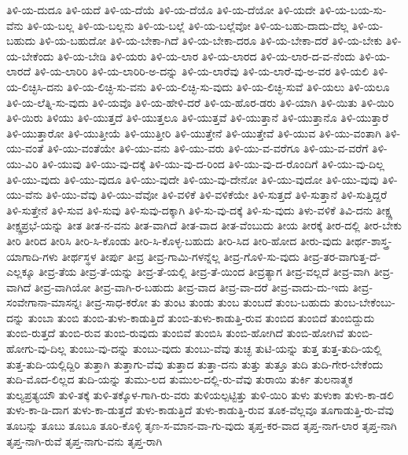{ತಿಳಿ-ಯ-ದುದೂ
ತಿಳಿ-ಯದೆ
ತಿಳಿ-ಯ-ದೆಯೆ
ತಿಳಿ-ಯ-ದೆಯೊ
ತಿಳಿ-ಯ-ದೆಯೋ
ತಿಳಿ-ಯದೇ
ತಿಳಿ-ಯ-ಬಯ-ಸು-ವೆನು
ತಿಳಿ-ಯ-ಬಲ್ಲ
ತಿಳಿ-ಯ-ಬಲ್ಲನು
ತಿಳಿ-ಯ-ಬಲ್ಲೆ
ತಿಳಿ-ಯ-ಬಲ್ಲೆವೋ
ತಿಳಿ-ಯ-ಬಹು-ದಾದು-ದೆಲ್ಲ
ತಿಳಿ-ಯ-ಬಹುದು
ತಿಳಿ-ಯ-ಬಹುದೋ
ತಿಳಿ-ಯ-ಬೇಕಾ-ಗಿದೆ
ತಿಳಿ-ಯ-ಬೇಕಾ-ದರೂ
ತಿಳಿ-ಯ-ಬೇಕಾ-ದರೆ
ತಿಳಿ-ಯ-ಬೇಕು
ತಿಳಿ-ಯ-ಬೇಕೆಂದು
ತಿಳಿ-ಯ-ಬೇಡಿ
ತಿಳಿ-ಯರು
ತಿಳಿ-ಯ-ಲಾರ
ತಿಳಿ-ಯ-ಲಾರದ
ತಿಳಿ-ಯ-ಲಾರ-ದ-ವ-ನೆಂದು
ತಿಳಿ-ಯ-ಲಾರದೆ
ತಿಳಿ-ಯ-ಲಾರಿರಿ
ತಿಳಿ-ಯ-ಲಾರಿರಿ-ಅ-ದನ್ನು
ತಿಳಿ-ಯ-ಲಾರೆವು
ತಿಳಿ-ಯ-ಲಾರೆ-ವು-ಅ-ವರ
ತಿಳಿ-ಯಲಿ
ತಿಳಿ-ಯ-ಲಿಚ್ಛಿಸಿ-ದನು
ತಿಳಿ-ಯ-ಲಿಚ್ಛಿ-ಸು-ವನು
ತಿಳಿ-ಯ-ಲಿಚ್ಛಿ-ಸು-ವುದು
ತಿಳಿ-ಯ-ಲಿಚ್ಛಿ-ಸುವೆ
ತಿಳಿ-ಯಲು
ತಿಳಿ-ಯಲೂ
ತಿಳಿ-ಯ-ಲೆತ್ನಿ-ಸು-ವುದು
ತಿಳಿ-ಯವೊ
ತಿಳಿ-ಯ-ಹೇಳಿ-ದರೆ
ತಿಳಿ-ಯ-ಹೊರ-ಡರು
ತಿಳಿ-ಯಾಗಿ
ತಿಳಿ-ಯಿತು
ತಿಳಿ-ಯಿರಿ
ತಿಳಿ-ಯಿರು
ತಿಳಿಯು
ತಿಳಿ-ಯುತ್ತದೆ
ತಿಳಿ-ಯುತ್ತಲೂ
ತಿಳಿ-ಯುತ್ತವೆ
ತಿಳಿ-ಯುತ್ತಾನೆ
ತಿಳಿ-ಯುತ್ತಾನೊ
ತಿಳಿ-ಯುತ್ತಾರೆ
ತಿಳಿ-ಯುತ್ತಾರೋ
ತಿಳಿ-ಯುತ್ತೀಯೆ
ತಿಳಿ-ಯುತ್ತೀರಿ
ತಿಳಿ-ಯುತ್ತೇನೆ
ತಿಳಿ-ಯುತ್ತೇವೆ
ತಿಳಿ-ಯುವ
ತಿಳಿ-ಯು-ವಂತಾಗಿ
ತಿಳಿ-ಯು-ವಂತೆ
ತಿಳಿ-ಯು-ವಂತೆಯೇ
ತಿಳಿ-ಯು-ವನು
ತಿಳಿ-ಯು-ವರು
ತಿಳಿ-ಯು-ವ-ವರೆಗೂ
ತಿಳಿ-ಯು-ವ-ವರೆಗೆ
ತಿಳಿ-ಯು-ವಿರಿ
ತಿಳಿ-ಯುವು
ತಿಳಿ-ಯು-ವು-ದಕ್ಕೆ
ತಿಳಿ-ಯು-ವು-ದ-ರಿಂದ
ತಿಳಿ-ಯು-ವು-ದ-ರೊಂದಿಗೆ
ತಿಳಿ-ಯು-ವು-ದಿಲ್ಲ
ತಿಳಿ-ಯು-ವುದು
ತಿಳಿ-ಯು-ವುದೂ
ತಿಳಿ-ಯು-ವುದೇ
ತಿಳಿ-ಯು-ವು-ದೇನೋ
ತಿಳಿ-ಯು-ವುದೋ
ತಿಳಿ-ಯು-ವುವು
ತಿಳಿ-ಯು-ವೆನು
ತಿಳಿ-ಯು-ವೆವು
ತಿಳಿ-ಯು-ವೆವೋ
ತಿಳಿ-ವಳಿಕೆ
ತಿಳಿ-ವಳಿಕೆಯೇ
ತಿಳಿ-ಸುತ್ತದೆ
ತಿಳಿ-ಸುತ್ತಾನೆ
ತಿಳಿ-ಸುತ್ತಿದ್ದರೆ
ತಿಳಿ-ಸುತ್ತೇನೆ
ತಿಳಿ-ಸುವ
ತಿಳಿ-ಸುವು
ತಿಳಿ-ಸುವು-ದಕ್ಕಾಗಿ
ತಿಳಿ-ಸು-ವು-ದಕ್ಕೆ
ತಿಳಿ-ಸು-ವುದು
ತಿಳು-ವಳಿಕೆ
ತಿವಿ-ದನು
ತೀಕ್ಷ್ಣ
ತೀಕ್ಷ್ಣಪ್ರಭೆ-ಯನ್ನು
ತೀತ
ತೀತ-ನ-ವನು
ತೀತ-ವಾಗಿದೆ
ತೀತ-ವಾದ
ತೀತ-ವೆಂಬುದು
ತೀಯ
ತೀರಕ್ಕೆ
ತೀರ-ದಲ್ಲಿ
ತೀರ-ಬೇಕು
ತೀರಿ
ತೀರಿದ
ತೀರಿಸಿ
ತೀರಿ-ಸಿ-ಕೊಂಡು
ತೀರಿ-ಸಿ-ಕೊಳ್ಳ-ಬಹುದು
ತೀರಿ-ಸಿದ
ತೀರಿ-ಹೋದ
ತೀರು-ವುದು
ತೀರ್ಥ-ಶಾಸ್ತ್ರ-ಯಾಗಾದಿ-ಗಳು
ತೀರ್ಥಸ್ಥಳ
ತೀರ್ಪು
ತೀವ್ರ
ತೀವ್ರ-ಗಾಮಿ-ಗಳನ್ನೆಲ್ಲ
ತೀವ್ರ-ಗೊಳಿ-ಸು-ವುದು
ತೀವ್ರ-ತರ-ವಾಗುತ್ತ-ದೆ-ಎಲ್ಲಕ್ಕೂ
ತೀವ್ರ-ತೆಯ
ತೀವ್ರ-ತೆ-ಯನ್ನು
ತೀವ್ರ-ತೆ-ಯಲ್ಲಿ
ತೀವ್ರ-ತೆ-ಯಿಂದ
ತೀವ್ರತ್ಯಾಗ
ತೀವ್ರ-ವಲ್ಲದೆ
ತೀವ್ರ-ವಾಗಿ
ತೀವ್ರ-ವಾಗಿದೆ
ತೀವ್ರ-ವಾಗಿಯೋ
ತೀವ್ರ-ವಾಗಿ-ರ-ಬಹುದು
ತೀವ್ರ-ವಾದ
ತೀವ್ರ-ವಾ-ದರೆ
ತೀವ್ರ-ವಾದು-ದು-ಇದು
ತೀವ್ರ-ಸಂವೇಗಾನಾ-ಮಾಸನ್ನಃ
ತೀವ್ರ-ಸಾಧ-ಕರೋ
ತು
ತುಂಟ
ತುಂಡು
ತುಂಬ
ತುಂಬದೆ
ತುಂಬ-ಬಹುದು
ತುಂಬ-ಬೇಕೆಂಬು-ದನ್ನು
ತುಂಬಾ
ತುಂಬಿ
ತುಂಬಿ-ತುಳು-ಕಾಡುತ್ತಿದೆ
ತುಂಬಿ-ತುಳು-ಕಾಡುತ್ತಿ-ರುವ
ತುಂಬಿದ
ತುಂಬಿದೆ
ತುಂಬಿದ್ದುದು
ತುಂಬಿ-ರುತ್ತದೆ
ತುಂಬಿ-ರುವ
ತುಂಬಿ-ರುವುದು
ತುಂಬಿವೆ
ತುಂಬಿಸಿ
ತುಂಬಿ-ಹೋಗಿದೆ
ತುಂಬಿ-ಹೋಗಿವೆ
ತುಂಬಿ-ಹೋಗು-ವು-ದಿಲ್ಲ
ತುಂಬು-ವು-ದನ್ನು
ತುಂಬು-ವುದು
ತುಂಬು-ವೆವು
ತುಚ್ಛ
ತುಟಿ-ಯನ್ನು
ತುತ್ತ
ತುತ್ತ-ತುದಿ-ಯಲ್ಲಿ
ತುತ್ತ-ತುದಿ-ಯಲ್ಲಿದ್ದಿರಿ
ತುತ್ತಾಗಿ
ತುತ್ತಾಗು-ವೆವು
ತುತ್ತಾದ
ತುತ್ತಾ-ದನು
ತುತ್ತು
ತುತ್ತೂ
ತುದಿ
ತುದಿ-ಗೇರ-ಬೇಕೆಂದು
ತುದಿ-ಮೊದ-ಲಿಲ್ಲದ
ತುದಿ-ಯನ್ನು
ತುಮು-ಲದ
ತುಮುಲ-ದಲ್ಲಿ-ರು-ವೆವು
ತುರಾಯಿ
ತುರ್ಕಿ
ತುಲನಾತ್ಮಕ
ತುಲ್ಯಪ್ರತ್ಯಯೌ
ತುಳಿ-ತಕ್ಕೆ
ತುಳಿ-ತಕ್ಕೊಳ-ಗಾಗಿ-ರು-ವರು
ತುಳಿಯಲ್ಪಟ್ಟಿತ್ತು
ತುಳಿ-ಯಿರಿ
ತುಳು
ತುಳುಕಾ
ತುಳು-ಕಾ-ಡಲಿ
ತುಳು-ಕಾ-ಡಿ-ದಾಗ
ತುಳು-ಕಾ-ಡುತ್ತದೆ
ತುಳು-ಕಾಡುತ್ತಿದೆ
ತುಳು-ಕಾಡುತ್ತಿ-ರುವ
ತೂಕ-ವೆಲ್ಲವೂ
ತೂಗಾಡುತ್ತಿ-ರು-ವೆವು
ತೂಬನ್ನು
ತೂಬು
ತೂಬೂ
ತೂರಿ-ಕೊಳ್ಳಿ
ತೃಣ-ಸ-ಮಾನ-ವಾ-ಗು-ವುದು
ತೃಪ್ತ-ಕರ-ವಾದ
ತೃಪ್ತ-ನಾಗ-ಲಾರ
ತೃಪ್ತ-ನಾಗಿ
ತೃಪ್ತ-ನಾಗಿ-ರುವೆ
ತೃಪ್ತ-ನಾಗು-ವನು
ತೃಪ್ತ-ರಾಗಿ
}
